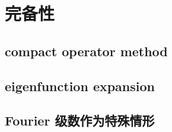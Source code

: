\section{完备性}
\label{b2:sec:1003}


\subsection{compact operator method}
\label{b2:subsec:100301}

\subsection{eigenfunction expansion}
\label{b2:subsec:100302}

\subsection{Fourier 级数作为特殊情形}
\label{b2:subsec:100303}


